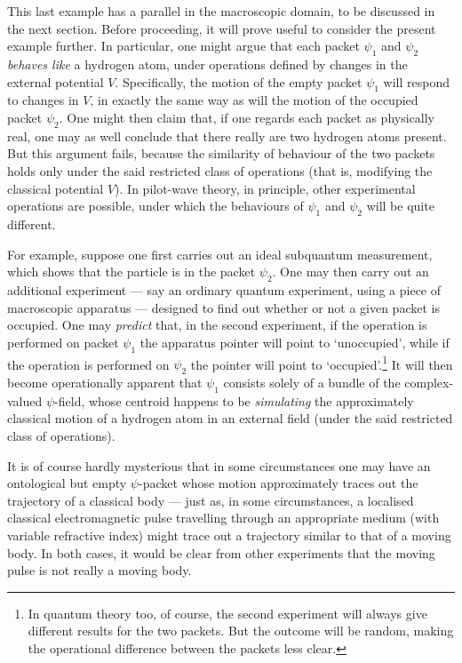 \documentclass{article}%
\begin{document}
This last example has a parallel in the macroscopic domain, to be discussed in
the next section. Before proceeding, it will prove useful to consider the
present example further. In particular, one might argue that each packet
$\psi_{1}$ and $\psi_{2}$ \textit{behaves like} a hydrogen atom, under
operations defined by changes in the external potential $V$. Specifically, the
motion of the empty packet $\psi_{1}$ will respond to changes in $V$, in
exactly the same way as will the motion of the occupied packet $\psi_{2}$. One
might then claim that, if one regards each packet as physically real, one may
as well conclude that there really are two hydrogen atoms present. But this
argument fails, because the similarity of behaviour of the two packets holds
only under the said restricted class of operations (that is, modifying the
classical potential $V$). In pilot-wave theory, in principle, other
experimental operations are possible, under which the behaviours of $\psi_{1}$
and $\psi_{2}$ will be quite different.

For example, suppose one first carries out an ideal subquantum measurement,
which shows that the particle is in the packet $\psi_{2}$. One may then carry
out an additional experiment --- say an ordinary quantum experiment, using a
piece of macroscopic apparatus --- designed to find out whether or not a given
packet is occupied. One may \textit{predict} that, in the second experiment,
if the operation is performed on packet $\psi_{1}$ the apparatus pointer will
point to `unoccupied', while if the operation is performed on $\psi_{2}$ the
pointer will point to `occupied'.\footnote{In quantum theory too, of course,
the second experiment will always give different results for the two packets.
But the outcome will be random, making the operational difference between the
packets less clear.} It will then become operationally apparent that $\psi
_{1}$ consists solely of a bundle of the complex-valued $\psi$-field, whose
centroid happens to be \textit{simulating} the approximately classical motion
of a hydrogen atom in an external field (under the said restricted class of operations).

It is of course hardly mysterious that in some circumstances one may have an
ontological but empty $\psi$-packet whose motion approximately traces out the
trajectory of a classical body --- just as, in some circumstances, a localised
classical electromagnetic pulse travelling through an appropriate medium (with
variable refractive index) might trace out a trajectory similar to that of a
moving body. In both cases, it would be clear from other experiments that the
moving pulse is not really a moving body.
\end{document}
